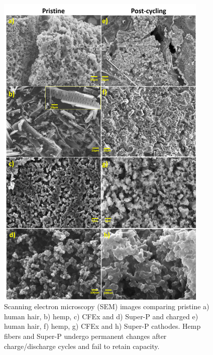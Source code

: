 \begin{figure}[h!]
  \centering
  \includegraphics[width=0.9\textwidth]{Figures/chap5fig/SEM}
    \caption{Scanning electron microscopy (SEM) images comparing pristine a) human hair, b) hemp, c) CFEx and d) Super-P and charged e) human hair, f) hemp, g) CFEx and h) Super-P cathodes. Hemp fibers and Super-P undergo permanent changes after charge/discharge cycles and fail to retain capacity.}
  \label{Figures/chap5fig:SEM}
\end{figure}

